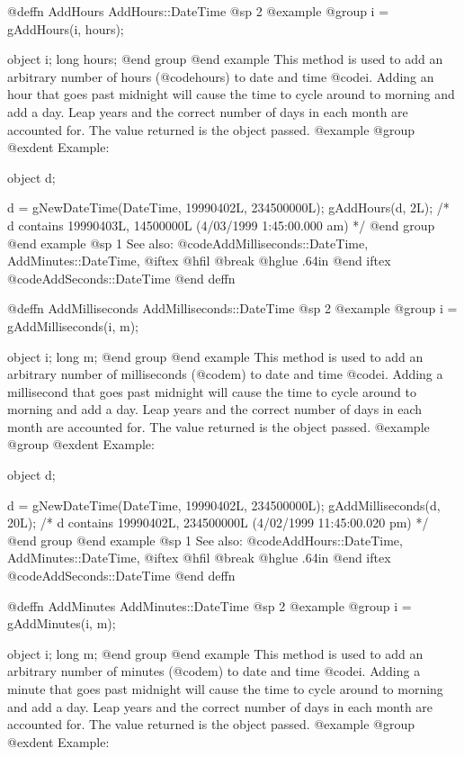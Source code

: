 @deffn {AddHours} AddHours::DateTime
@sp 2
@example
@group
i = gAddHours(i, hours);

object  i;
long    hours;
@end group
@end example
This method is used to add an arbitrary number of hours (@code{hours}) to
date and time @code{i}.  Adding an hour that goes past midnight will cause the time
to cycle around to morning and add a day.  Leap years and the correct number of
days in each month are accounted for.  The value returned is the object passed.
@example
@group
@exdent Example:

object  d;

d = gNewDateTime(DateTime, 19990402L, 234500000L);
gAddHours(d, 2L);
/*  d contains 19990403L, 14500000L
    (4/03/1999 1:45:00.000 am) */
@end group
@end example
@sp 1
See also:  @code{AddMilliseconds::DateTime, AddMinutes::DateTime,}
@iftex
@hfil @break @hglue .64in      
@end iftex
@code{AddSeconds::DateTime}
@end deffn








@deffn {AddMilliseconds} AddMilliseconds::DateTime
@sp 2
@example
@group
i = gAddMilliseconds(i, m);

object  i;
long    m;
@end group
@end example
This method is used to add an arbitrary number of milliseconds (@code{m}) to
date and time @code{i}.  Adding a millisecond that goes past midnight will cause
the time to cycle around to morning and add a day.  Leap years and the correct
number of days in each month are accounted for.  The value returned is the
object passed.
@example
@group
@exdent Example:

object  d;

d = gNewDateTime(DateTime, 19990402L, 234500000L);
gAddMilliseconds(d, 20L);
/*  d contains 19990402L, 234500000L
    (4/02/1999 11:45:00.020 pm) */
@end group
@end example
@sp 1
See also:  @code{AddHours::DateTime, AddMinutes::DateTime,}
@iftex
@hfil @break @hglue .64in      
@end iftex
@code{AddSeconds::DateTime}
@end deffn











@deffn {AddMinutes} AddMinutes::DateTime
@sp 2
@example
@group
i = gAddMinutes(i, m);

object  i;
long    m;
@end group
@end example
This method is used to add an arbitrary number of minutes (@code{m}) to
date and time @code{i}.  Adding a minute that goes past midnight will cause the time
to cycle around to morning and add a day.  Leap years and the correct number of
days in each month are accounted for.  The value returned is the object passed.
@example
@group
@exdent Example:

